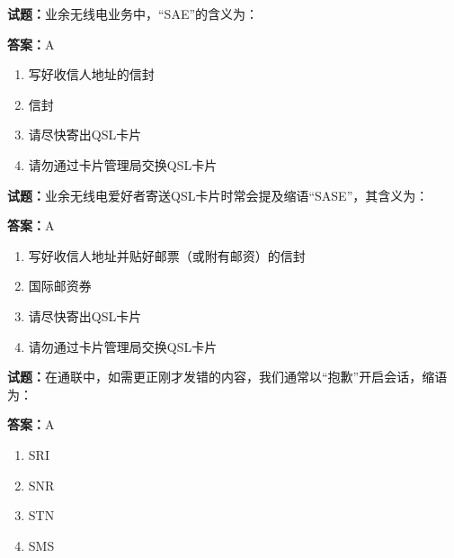 \documentclass{ctexbook}
\begin{document}




\vspace{1em}

\textbf{试题：}业余无线电业务中，“SAE”的含义为： 

\textbf{答案：}A 

\begin{enumerate}[leftmargin=3em]
  \item 写好收信人地址的信封 

  \item 信封 

  \item 请尽快寄出QSL卡片 

  \item 请勿通过卡片管理局交换QSL卡片 

\end{enumerate}






\vspace{1em}

\textbf{试题：}业余无线电爱好者寄送QSL卡片时常会提及缩语“SASE”，其含义为： 

\textbf{答案：}A 

\begin{enumerate}[leftmargin=3em]
  \item 写好收信人地址并贴好邮票（或附有邮资）的信封 

  \item 国际邮资券 

  \item 请尽快寄出QSL卡片 

  \item 请勿通过卡片管理局交换QSL卡片 

\end{enumerate}





\vspace{1em}

\textbf{试题：}在通联中，如需更正刚才发错的内容，我们通常以“抱歉”开启会话，缩语为： 

\textbf{答案：}A 

\begin{enumerate}[leftmargin=3em]
  \item SRI 

  \item SNR 

  \item STN 

  \item SMS 

\end{enumerate}
\end{document}

